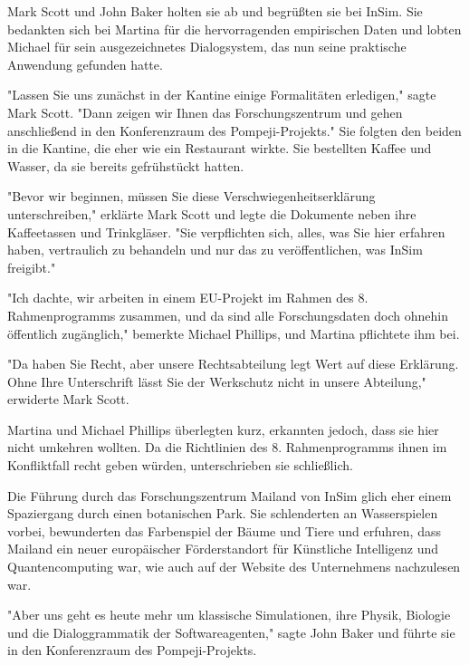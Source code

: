 \documentclass[
]{article}
\begin{document}
Mark Scott und John Baker holten sie ab und begrüßten sie bei InSim. Sie
bedankten sich bei Martina für die hervorragenden empirischen Daten und
lobten Michael für sein ausgezeichnetes Dialogsystem, das nun seine
praktische Anwendung gefunden hatte.

"Lassen Sie uns zunächst in der Kantine einige Formalitäten erledigen,"
sagte Mark Scott. "Dann zeigen wir Ihnen das Forschungszentrum und gehen
anschließend in den Konferenzraum des Pompeji-Projekts." Sie folgten den
beiden in die Kantine, die eher wie ein Restaurant wirkte. Sie
bestellten Kaffee und Wasser, da sie bereits gefrühstückt hatten.

"Bevor wir beginnen, müssen Sie diese Verschwiegenheitserklärung
unterschreiben," erklärte Mark Scott und legte die Dokumente neben ihre
Kaffeetassen und Trinkgläser. "Sie verpflichten sich, alles, was Sie
hier erfahren haben, vertraulich zu behandeln und nur das zu
veröffentlichen, was InSim freigibt."

"Ich dachte, wir arbeiten in einem EU-Projekt im Rahmen des 8.
Rahmenprogramms zusammen, und da sind alle Forschungsdaten doch ohnehin
öffentlich zugänglich," bemerkte Michael Phillips, und Martina
pflichtete ihm bei.

"Da haben Sie Recht, aber unsere Rechtsabteilung legt Wert auf diese
Erklärung. Ohne Ihre Unterschrift lässt Sie der Werkschutz nicht in
unsere Abteilung," erwiderte Mark Scott.

Martina und Michael Phillips überlegten kurz, erkannten jedoch, dass sie
hier nicht umkehren wollten. Da die Richtlinien des 8. Rahmenprogramms
ihnen im Konfliktfall recht geben würden, unterschrieben sie
schließlich.

Die Führung durch das Forschungszentrum Mailand von InSim glich eher
einem Spaziergang durch einen botanischen Park. Sie schlenderten an
Wasserspielen vorbei, bewunderten das Farbenspiel der Bäume und Tiere
und erfuhren, dass Mailand ein neuer europäischer Förderstandort für
Künstliche Intelligenz und Quantencomputing war, wie auch auf der
Website des Unternehmens nachzulesen war.

"Aber uns geht es heute mehr um klassische Simulationen, ihre Physik,
Biologie und die Dialoggrammatik der Softwareagenten," sagte John Baker
und führte sie in den Konferenzraum des Pompeji-Projekts.
\end{document}
